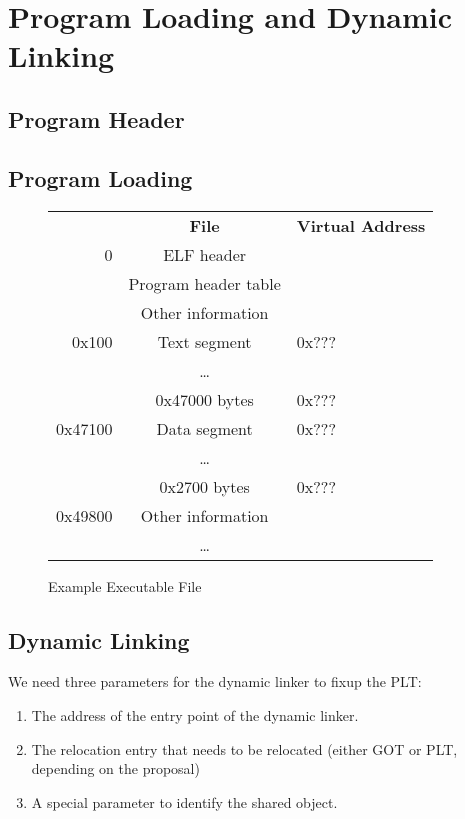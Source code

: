 \chapter{Program Loading and Dynamic Linking}

\section{Program Header}

\section{Program Loading}

\begin{figure}[H]
\caption{Example Executable File}
\begin{center}
\begin{tabular}{r|c|l}
\noalign{\smallskip}
\multicolumn{1}{l}{\bf File Offset} & \multicolumn{1}{c}{\bf File} &
\bf Virtual Address \\
\noalign{\smallskip}  \cline{2-2}
0 & ELF header & \\ \cline{2-2}
& Program header table & \\ \cline{2-2}
& Other information & \\ \cline{2-2}
0x100 & Text segment & 0x???\\ \cline{2-2}
& \dots & \\
& 0x47000 bytes & 0x??? \\ \cline{2-2}
0x47100& Data segment & 0x??? \\
& \dots & \\
& 0x2700 bytes & 0x??? \\ \cline{2-2}
0x49800& Other information & \\
& \dots & \\ \cline{2-2}
\end{tabular}
\end{center}
\end{figure}

\section{Dynamic Linking}

We need three parameters for the dynamic linker to fixup the
PLT:
\begin{enumerate}
\item The address of the entry point of the dynamic linker.
\item The relocation entry that needs to be relocated (either GOT or
  PLT, depending on the proposal)
\item A special parameter to identify the shared object.
\end{enumerate}

